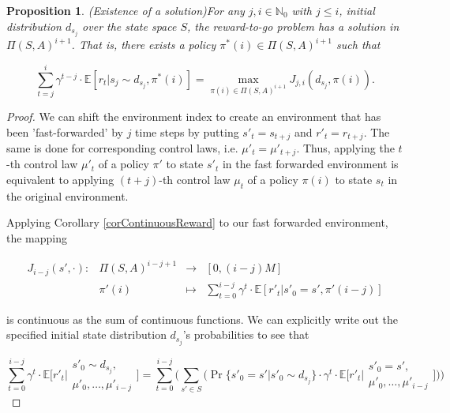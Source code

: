 \documentclass[11pt]{article} %
\newtheorem{prop}{Proposition}
\begin{document}
\begin{prop}(Existence of a solution)\label{propExistenceFiniteSolution}
	For any $j,i \in \mathbb{N}_0$ with $j \le i$, initial distribution $d_{s_j}$ over the state space $S$, the reward-to-go problem has a solution in $\Pi(S,A)^{i+1}$. That is, there exists a policy $\pi^*(i) \in \Pi(S,A)^{i+1}$ such that

\begin{equation}
	\sum\limits_{t=j}^i \gamma^{t-j} \cdot \mathbb{E}[ r_t | s_j \sim d_{s_j}, \pi^*(i)] = \max_{\pi(i) \in \Pi(S,A)^{i+1}} J_{j,i}(d_{s_j},\pi(i)).
\end{equation}

\end{prop}

\begin{proof}
We can shift the environment index to create an environment that has been 'fast-forwarded' by $j$ time steps by putting $s'_{t} = s_{t+j}$ and $r'_t = r_{t+j}$. The same is done for corresponding control laws, i.e. $\mu'_t = \mu'_{t + j}$. Thus, applying the $t$-th control law $\mu'_t$ of a policy $\pi'$ to state $s'_t$ in the fast forwarded environment is equivalent to applying $(t+j)$-th control law $\mu_t$ of a policy $\pi(i)$ to state $s_t$ in the original environment. 

Applying Corollary \ref{corContinuousReward} to our fast forwarded environment, the mapping 

\begin{equation}\label{contDiscExpRewSumMap}
	\begin{array}{rccl}
		J_{i-j}(s',\cdot): 	& \Pi(S,A)^{i-j+1} 	& \rightarrow 	& [0,(i-j) M] \\
					& \pi'(i)		& \mapsto 	& \sum\limits_{t=0}^{i-j} \gamma^t \cdot \mathbb{E}[ r'_t | s'_0 = s', \pi'(i-j)]
	\end{array}
\end{equation}

is continuous as the sum of continuous functions. We can explicitly write out the specified initial state distribution $d_{s_j}$'s probabilities to see that

\begin{equation}
	\sum\limits_{t=0}^{i-j} \gamma^t \cdot \mathbb{E} \Big[ r'_t \Big| \begin{array}{c}
																		s'_0 \sim d_{s_j}, \\
																		\mu'_0,\dots,\mu'_{i-j}
																	\end{array} \Big]  = \sum\limits_{t=0}^{i-j} \Big( \sum\limits_{s' \in S} \Big( \Pr\{ s'_0 = s' | s'_0 \sim d_{s_j}\} \cdot \gamma^t \cdot \mathbb{E} \Big[ r'_t \Big| \begin{array}{c}
																			s'_0 = s', \\
																			\mu'_0,\dots,\mu'_{i-j}
																		\end{array} \Big] \Big) \Big)
\end{equation}


\end{proof}
\end{document}
